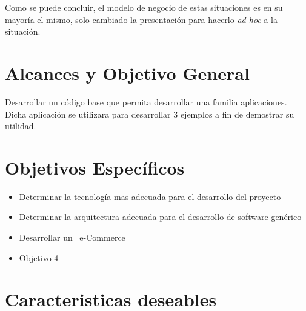 Como se puede concluir, el modelo de negocio de estas situaciones es en su mayoría el mismo, solo cambiado la presentación para hacerlo \textit{ad-hoc} a la situación.

\section{Alcances y Objetivo General}\label{cap:intro:alcances}
Desarrollar un código base que permita desarrollar una familia aplicaciones. Dicha aplicación se utilizara para desarrollar 3 ejemplos a fin de demostrar su utilidad.

\section{Objetivos Específicos}\label{cap:intro:objetivos}
\begin{itemize}
	\item Determinar la tecnología mas adecuada para el desarrollo del proyecto
	\item Determinar la arquitectura adecuada para el desarrollo de software genérico
	\item Desarrollar un \ e-Commerce
	\item Objetivo 4
\end{itemize}

\section{Caracteristicas deseables}\label{cap:intro:alcance}

